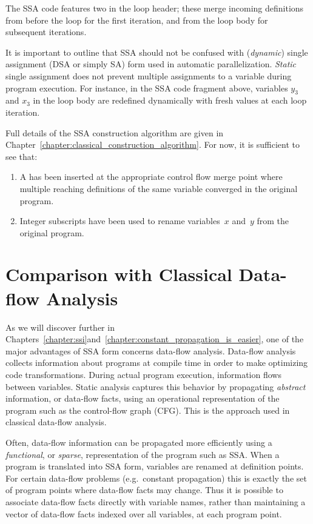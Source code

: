 The SSA code features two \phifuns in the loop header; these merge incoming definitions from before the loop for the first iteration, and from the loop body for subsequent iterations.

It is important to outline that SSA should not be confused with (\emph{dynamic}) single assignment (DSA or simply SA) form used in automatic parallelization. 
\emph{Static} single assignment does not prevent multiple assignments to a variable during program execution. 
For instance, in the SSA code fragment above, variables $y_3$ and $x_3$ in the loop body are redefined dynamically with fresh values at each loop iteration.

Full details of the SSA construction algorithm are given in Chapter~\ref{chapter:classical_construction_algorithm}. 
For now, it is sufficient to see that: \begin{enumerate} \item A \phifun has been inserted at the appropriate control flow merge point where multiple reaching definitions of the same variable converged in the original program.
\item Integer subscripts have been used to rename variables~$x$ and~$y$ from the original program.
\end{enumerate}

\section{Comparison with Classical Data-flow Analysis} \label{sec:vanilla:dfa}
As we will discover further in Chapters~\ref{chapter:ssi}\ifconstantprop and~\ref{chapter:constant_propagation_is_easier}\fi, one of the major advantages of SSA form concerns data-flow analysis. Data-flow analysis collects information about programs at compile time in order to make optimizing code transformations. 
During actual program execution, information flows between variables. 
Static analysis captures this behavior by propagating \textit{abstract} information, or data-flow facts, using an operational representation of the program such as the control-flow graph (CFG). 
This is the approach used in classical data-flow analysis.

Often, data-flow information can be propagated more efficiently using a \textit{functional}, or \textit{sparse}, representation of the program such as SSA. 
When a program is translated into SSA form, variables are renamed at definition points. 
For certain data-flow problems (e.g.~constant propagation) this is exactly the set of program points where data-flow facts may change. 
Thus it is possible to associate data-flow facts directly with variable names, rather than maintaining a vector of data-flow facts indexed over all variables, at each program point.

